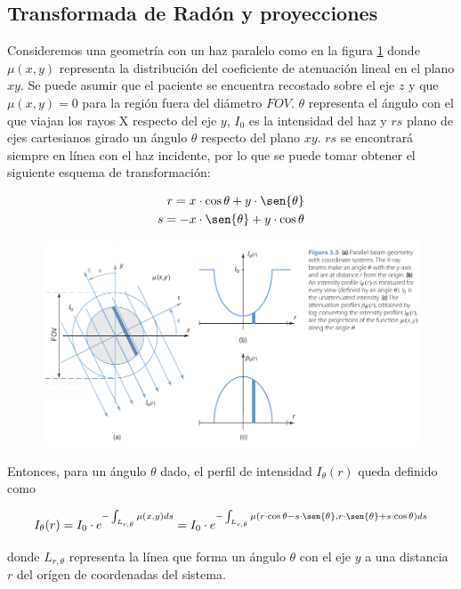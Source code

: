 \subsection{Transformada de Rad\'on y proyecciones}

Consideremos una geometría con un haz paralelo como en la figura \ref{fig:10-1} donde $\mu(x,y)$ representa la distribución del coeficiente de atenuación lineal en el plano $xy$. Se puede asumir que el paciente se encuentra recostado sobre el eje $z$ y que $\mu(x,y) = 0$ para la región fuera del diámetro $FOV$. $\theta$ representa el ángulo con el que viajan los rayos X respecto del eje $y$, $I_{0}$ es la intensidad del haz y $rs$ plano de ejes cartesianos girado un ángulo $\theta$ respecto del plano $xy$. $rs$ se encontrará siempre en línea con el haz incidente, por lo que se puede tomar obtener el siguiente esquema de transformación:

\begin{eqnarray}
 r = x\cdot \cos{\theta} + y \cdot \sen{\theta} \\
 s = - x \cdot \sen{\theta} + y \cdot \cos{\theta}
\end{eqnarray}

\begin{figure}
 \centering
 \includegraphics[width=.75\textwidth]{figures/cap10-1.png}
 \caption{}
 \label{fig:10-1}
\end{figure}

Entonces, para un ángulo $\theta$ dado, el perfil de intensidad $I_{\theta}(r)$ queda definido como

\begin{equation}
 I_{\theta}(r) = I_{0} \cdot e^{-\int_{L_{r,\theta}}\mu(x,y)ds} = I_{0} \cdot e^{-\int_{L_{r,\theta}}\mu(r\cdot \cos{\theta} - s\cdot \sen{\theta},r\cdot\sen{\theta} + s\cdot\cos{\theta})ds}
 \label{eq.10-4}
\end{equation}

\noindent
donde $L_{r,\theta}$ representa la línea que forma un ángulo $\theta$ con el eje $y$ a una distancia $r$ del orígen de coordenadas del sistema.

